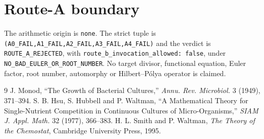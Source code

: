 \documentclass[10pt]{article}
\begin{document}
\section{Route-A boundary}
The arithmetic origin is \texttt{none}.  The strict tuple is
\texttt{(A0\_FAIL,A1\_FAIL,A2\_FAIL,A3\_FAIL,A4\_FAIL)} and the verdict is
\texttt{ROUTE\_A\_REJECTED}, with
\texttt{route\_b\_invocation\_allowed: false}, under
\texttt{NO\_BAD\_EULER\_OR\_ROOT\_NUMBER}.  No target divisor, functional
equation, Euler factor, root number, automorphy or Hilbert--P\'olya operator is
claimed.
\begin{thebibliography}{9}
 J. Monod, ``The Growth of Bacterial Cultures,''
\emph{Annu. Rev. Microbiol.} 3 (1949), 371--394.
 S. B. Hsu, S. Hubbell and P. Waltman, ``A Mathematical Theory
for Single-Nutrient Competition in Continuous Cultures of Micro-Organisms,''
\emph{SIAM J. Appl. Math.} 32 (1977), 366--383.
 H. L. Smith and P. Waltman, \emph{The Theory of the Chemostat},
Cambridge University Press, 1995.
\end{thebibliography}
\end{document}
